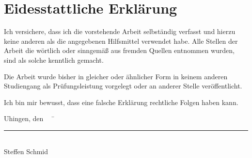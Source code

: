 
\chapter*{Eidesstattliche Erklärung}

Ich versichere, dass ich die vorstehende Arbeit selbständig verfasst und hierzu keine anderen als die angegebenen Hilfsmittel verwendet habe.
Alle Stellen der Arbeit die wörtlich oder sinngemäß aus fremden Quellen entnommen wurden, sind als solche kenntlich gemacht.

Die Arbeit wurde bisher in gleicher oder ähnlicher Form in keinem anderen Studiengang als Prüfungsleistung vorgelegt oder an anderer Stelle veröffentlicht.

Ich bin mir bewusst, dass eine falsche Erklärung rechtliche Folgen haben kann.

\vspace{0.5cm}

\begin{tabbing}
          Uhingen, den \workDatum ~~	\= \rule{5cm}{0.3mm}\\
                                                                                                    \> Steffen Schmid
\end{tabbing}

